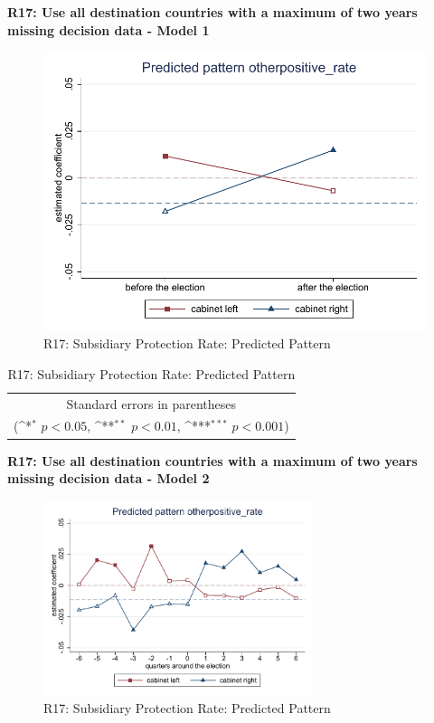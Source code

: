 \documentclass[10pt,a4paper]{scrartcl}
\begin{document}
\clearpage
\textbf{R17: Use all destination countries with a maximum of two years missing decision data - Model 1}
\begin{figure}[!ht]
	\centering
	\includegraphics[width=1\textwidth]{figures_edited/otherpositive_rate_graph1_R17.pdf}
	\caption{R17: Subsidiary Protection Rate: Predicted Pattern}
\end{figure}

\begin{table}[!ht]\centering
	\renewcommand{\arraystretch}{1.25}
	\def\sym#1{\ifmmode^{#1}\else\(^{#1}\)\fi}
	\caption{R17: Subsidiary Protection Rate: Predicted Pattern}
	\begin{tabular}{l*{2}{c}}
		\hline\hline
		
		\hline\hline
		\multicolumn{3}{c}{\footnotesize Standard errors in parentheses} \\
		\multicolumn{3}{c}{\footnotesize (\sym{*} \(p<0.05\), \sym{**} \(p<0.01\), \sym{***} \(p<0.001\))}\\
	\end{tabular}
\end{table}

\clearpage
\textbf{R17: Use all destination countries with a maximum of two years missing decision data - Model 2}
\begin{figure}[!ht]
	\centering
	\includegraphics[width=0.7\textwidth]{figures_edited/otherpositive_rate_graph2_R17.pdf}
	\caption{R17: Subsidiary Protection Rate: Predicted Pattern}
\end{figure}
\end{document}
